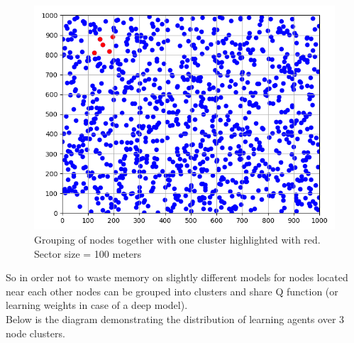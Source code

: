 \begin{figure}[H]
\centering
\includegraphics[scale=0.7]{figures/my_sectors.PNG}
  \caption{Grouping of nodes together with one cluster highlighted with red. \\ Sector size = 100 meters}
  \label{fig:my_sectors}
\end{figure}

So in order not to waste memory on slightly different models for nodes located near each other nodes can be grouped into clusters and share Q function (or learning weights
in case of a deep model). \\

Below is the diagram demonstrating the distribution of 
learning agents over 3 node clusters.\\

